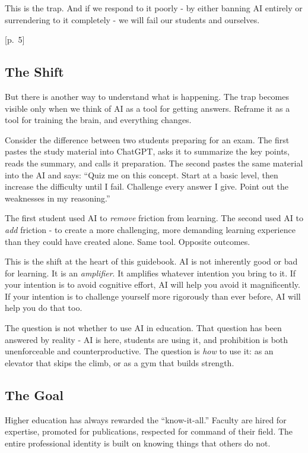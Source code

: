 \documentclass[
  letterpaper,
  DIV=11,
  numbers=noendperiod]{scrreprt}
\begin{document}
This is the trap. And if we respond to it poorly - by either banning AI
entirely or surrendering to it completely - we will fail our students
and ourselves.

{[}p.~5{]}

\subsection{The Shift}\label{the-shift}

But there is another way to understand what is happening. The trap
becomes visible only when we think of AI as a tool for getting answers.
Reframe it as a tool for training the brain, and everything changes.

Consider the difference between two students preparing for an exam. The
first pastes the study material into ChatGPT, asks it to summarize the
key points, reads the summary, and calls it preparation. The second
pastes the same material into the AI and says: ``Quiz me on this
concept. Start at a basic level, then increase the difficulty until I
fail. Challenge every answer I give. Point out the weaknesses in my
reasoning.''

The first student used AI to \emph{remove} friction from learning. The
second used AI to \emph{add} friction - to create a more challenging,
more demanding learning experience than they could have created alone.
Same tool. Opposite outcomes.

This is the shift at the heart of this guidebook. AI is not inherently
good or bad for learning. It is an \emph{amplifier}. It amplifies
whatever intention you bring to it. If your intention is to avoid
cognitive effort, AI will help you avoid it magnificently. If your
intention is to challenge yourself more rigorously than ever before, AI
will help you do that too.

The question is not whether to use AI in education. That question has
been answered by reality - AI is here, students are using it, and
prohibition is both unenforceable and counterproductive. The question is
\emph{how} to use it: as an elevator that skips the climb, or as a gym
that builds strength.

\subsection{The Goal}\label{the-goal}

Higher education has always rewarded the ``know-it-all.'' Faculty are
hired for expertise, promoted for publications, respected for command of
their field. The entire professional identity is built on knowing things
that others do not.
\end{document}
